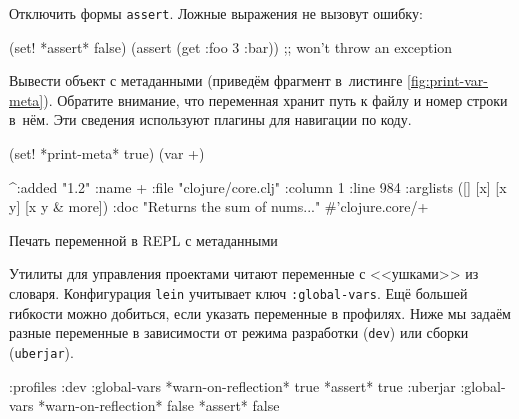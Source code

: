 \fi

\noindent
Отключить формы \verb|assert|. Ложные выражения не вызовут ошибку:

\begin{english}
  \begin{clojure}
(set! *assert* false)
(assert (get {:foo 3} :bar))
;; won't throw an exception
  \end{clojure}
\end{english}

\noindent
Вывести объект с метаданными (приведём фрагмент в~листинге
\ref{fig:print-var-meta}). Обратите внимание, что переменная хранит путь к файлу
и номер строки в~нём. Эти сведения используют плагины для навигации по коду.

\begin{listing}[ht!]

\begin{english}
  \begin{clojure}
(set! *print-meta* true)
(var +)

^{:added "1.2"
  :name +
  :file "clojure/core.clj"
  :column 1
  :line 984
  :arglists ([] [x] [x y] [x y & more])
  :doc "Returns the sum of nums..."}
#'clojure.core/+
  \end{clojure}
\end{english}

\caption{Печать переменной в REPL с метаданными}
\label{fig:print-var-meta}

\end{listing}


Утилиты для управления проектами читают переменные с <<ушками>> из
словаря. Конфигурация \verb|lein| учитывает ключ \verb|:global-vars|. Ещё
большей гибкости можно добиться, если указать переменные в профилях. Ниже мы
задаём разные переменные в зависимости от режима разработки (\verb|dev|) или
сборки (\verb|uberjar|).

\ifx\DEVICETYPE\MOBILE

\begin{english}
  \begin{clojure}
{:profiles
 :dev {:global-vars
       {*warn-on-reflection* true
        *assert* true}}
 :uberjar {:global-vars
           {*warn-on-reflection* false
            *assert* false}}}
  \end{clojure}
\end{english}

\else

